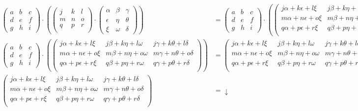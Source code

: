 \documentclass[letterpaper]{article}
\newcommand{\Nmat}{\begin{pmatrix}
		j & k & l\\
		m & n & o\\
		q & p & r\\
\end{pmatrix}}
\newcommand{\Pmat}{\begin{pmatrix}
		\alpha & \beta & \gamma\\
		\epsilon & \eta & \theta\\
		\xi & \omega & \delta
\end{pmatrix}}
\newcommand{\Mmat}{\begin{pmatrix}
		a & b & c\\
		d & e & f\\
		g & h & i
\end{pmatrix}}
\renewcommand{\*}{\cdot}
\theoremstyle{definition}
\begin{document}
\begin{align*}
	\Mmat \* \left( \Nmat \* \Pmat \right) &=  \Mmat \* \left( 
	\begin{pmatrix}
	j\alpha + k \epsilon + l\xi & j\beta + k\eta + l\omega & j\gamma +  k\theta + l\delta\\
	m\alpha + n\epsilon + o\xi & m\beta + n\eta + o\omega & m\gamma +  n\theta + o\delta\\
	q\alpha + p\epsilon + r\xi & q\beta + p\eta + r\omega & q\gamma +  p\theta + r\delta\\
	\end{pmatrix} 
	\right)\\
	\Mmat \* \left( 
	\begin{pmatrix}
	j\alpha + k \epsilon + l\xi & j\beta + k\eta + l\omega & j\gamma +  k\theta + l\delta\\
	m\alpha + n\epsilon + o\xi & m\beta + n\eta + o\omega & m\gamma +  n\theta + o\delta\\
	q\alpha + p\epsilon + r\xi & q\beta + p\eta + r\omega & q\gamma +  p\theta + r\delta\\
	\end{pmatrix} 
	\right) & = \begin{pmatrix}
	j\alpha + k \epsilon + l\xi & j\beta + k\eta + l\omega & j\gamma +  k\theta + l\delta\\
	m\alpha + n\epsilon + o\xi & m\beta + n\eta + o\omega & m\gamma +  n\theta + o\delta\\
	q\alpha + p\epsilon + r\xi & q\beta + p\eta + r\omega & q\gamma +  p\theta + r\delta\\
	\end{pmatrix} \\
	\begin{pmatrix}
	j\alpha + k \epsilon + l\xi & j\beta + k\eta + l\omega & j\gamma +  k\theta + l\delta\\
	m\alpha + n\epsilon + o\xi & m\beta + n\eta + o\omega & m\gamma +  n\theta + o\delta\\
	q\alpha + p\epsilon + r\xi & q\beta + p\eta + r\omega & q\gamma +  p\theta + r\delta\\
	\end{pmatrix}  & = \downarrow\\
\end{align*}
\end{document}
